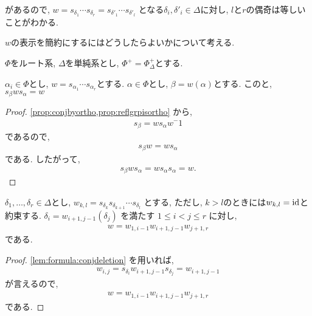 \begin{remark}
  があるので,
  $w=s_{\delta_1}\cdots s_{\delta_r}=s_{\delta'_1}\cdots s_{\delta'_l}$
  となる$\delta_i, \delta'_i\in \Delta$に対し,
  $l$と$r$の偶奇は等しいことがわかる.
\end{remark}


$w$の表示を簡約にするにはどうしたらよいかについて考える.

$\Phi$をルート系,
$\Delta$を単純系とし,
$\Phi^+=\Phi_\Delta^+$とする.


\begin{lemma}
  \label{lem:formula:conjdeletion}
  $\alpha_i\in\Phi$とし,
  $w=s_{\alpha_1}\cdots s_{\alpha_r}$とする.
  $\alpha\in\Phi$とし,
  $\beta=w(\alpha)$とする.
  このと, $s_\beta w s_\alpha=w$
\end{lemma}
\begin{proof}
\cref{prop:conjbyortho,prop:reflgrpisortho}
から,
\begin{align*}
  s_\beta=ws_\alpha w^-1
\end{align*}
であるので,
\begin{align*}
  s_\beta w=ws_\alpha 
\end{align*}
である.
したがって,
\begin{align*}
  s_\beta w s_\alpha=ws_\alpha s_\alpha= w. 
\end{align*}
\end{proof}

\begin{lemma}
  \label{lem:deletion:primitive}
  $\delta_1,\ldots,\delta_r \in\Delta$とし,
  $w_{k,l}=s_{\delta_k}s_{\delta_{k+1}}\cdots s_{\delta_l}$
  とする, ただし, $k>l$のときには$w_{k,l}=\operatorname{id}$と約束する.
  $\delta_i=w_{i+1,j-1}(\delta_j)$
  を満たす $1\leq i < j \leq r$
  に対し,
  \begin{align*}
    w=w_{1,i-1}w_{i+1,j-1}w_{j+1,r}
  \end{align*}
  である.
\end{lemma}

\begin{proof}
  \cref{lem:formula:conjdeletion}
  を用いれば,
  \begin{align*}
    w_{i,j}=
    s_{\delta_i}w_{i+1,j-1}s_{\delta_j}
    =w_{i+1,j-1}
  \end{align*}
  が言えるので,
  \begin{align*}
    w=w_{1,i-1}w_{i+1,j-1}w_{j+1,r}
  \end{align*}
  である.
\end{proof}

